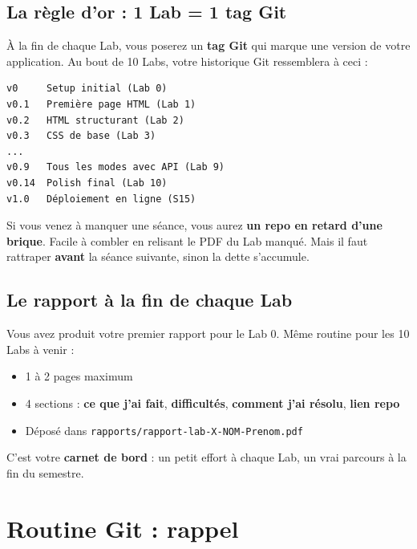\documentclass[11pt,a4paper]{article}
\begin{document}
\subsection{La règle d'or : 1 Lab = 1 tag Git}

À la fin de chaque Lab, vous poserez un \textbf{tag Git} qui marque une
version de votre application. Au bout de 10 Labs, votre historique Git
ressemblera à ceci :

\begin{lstlisting}
v0     Setup initial (Lab 0)
v0.1   Première page HTML (Lab 1)
v0.2   HTML structurant (Lab 2)
v0.3   CSS de base (Lab 3)
...
v0.9   Tous les modes avec API (Lab 9)
v0.14  Polish final (Lab 10)
v1.0   Déploiement en ligne (S15)
\end{lstlisting}

\begin{retenirbox}[Chaque Lab = une brique posée]
Si vous venez à manquer une séance, vous aurez \textbf{un repo en retard
d'une brique}. Facile à combler en relisant le PDF du Lab manqué. Mais il
faut rattraper \textbf{avant} la séance suivante, sinon la dette s'accumule.
\end{retenirbox}

\subsection{Le rapport à la fin de chaque Lab}

Vous avez produit votre premier rapport pour le Lab 0. Même routine pour
les 10 Labs à venir :

\begin{itemize}[leftmargin=*,nosep]
    \item 1 à 2 pages maximum
    \item 4 sections : \textbf{ce que j'ai fait}, \textbf{difficultés}, \textbf{comment j'ai résolu}, \textbf{lien repo}
    \item Déposé dans \texttt{rapports/rapport-lab-X-NOM-Prenom.pdf}
\end{itemize}

C'est votre \textbf{carnet de bord} : un petit effort à chaque Lab, un vrai
parcours à la fin du semestre.

\newpage

\section{Routine Git : rappel}
\end{document}
